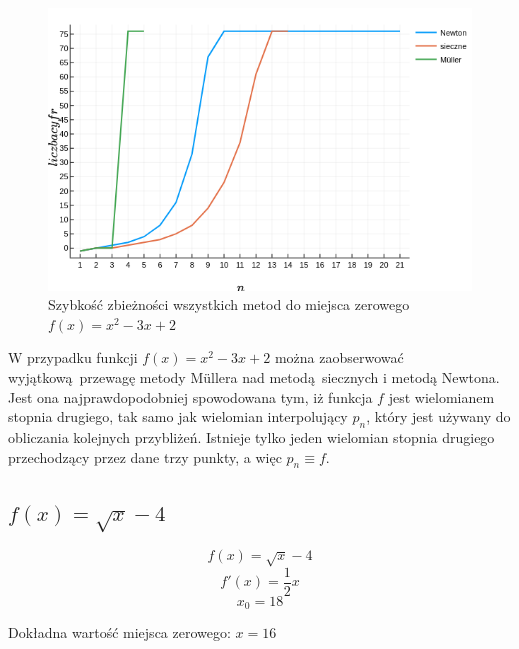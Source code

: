 \documentclass[12pt]{article}
\begin{document}
\begin{figure}[H]
    \centering
    \includegraphics[scale=0.7]{plot1.png}
\caption{Szybkość zbieżności wszystkich metod do miejsca 
         zerowego $f(x) = x^2 - 3x + 2$}
\label{figure:plot1}
\end{figure}

W przypadku funkcji $f(x) = x^2 - 3x + 2$ można zaobserwować wyjątkową przewagę
metody Müllera nad metodą siecznych i metodą Newtona. Jest ona najprawdopodobniej
spowodowana tym, iż funkcja $f$ jest wielomianem stopnia drugiego, tak samo jak 
wielomian interpolujący $p_n$, który jest używany do obliczania kolejnych 
przybliżeń. Istnieje tylko jeden wielomian stopnia drugiego przechodzący przez
dane trzy punkty, a więc $p_n \equiv f$.

\subsection{$f(x) = \sqrt{x} - 4$}

\[f(x) = \sqrt{x} - 4\]
\[f'(x) = \frac{1}{2}x\]
\[x_0 = 18\]
\begin{center}
    Dokładna wartość miejsca zerowego: $x = 16$
\end{center}
\end{document}
